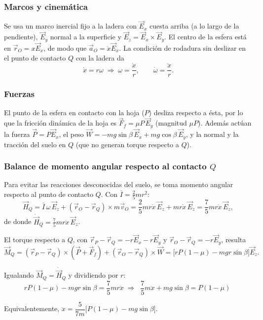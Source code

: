\begin{sol}

\subsubsection*{Marcos y cinemática}

Se usa un marco inercial fijo a la ladera con $\vec{E}_x$ cuesta arriba (a lo largo de la
pendiente), $\vec{E}_y$ normal a la superficie y $\vec{E}_z=\vec{E}_x\times\vec{E}_y$. El
centro de la esfera está en $\vec{r}_O=x\vec{E}_x$, de modo que $\vec{a}_O=\ddot{x}\vec{E}_x$.
La condición de rodadura sin deslizar en el punto de contacto $Q$ con la ladera da
$$\dot{x}=r\omega \;\Longrightarrow\; \omega=\frac{\dot{x}}{r},\qquad \dot\omega=\frac{\ddot{x}}{r}.$$

\subsubsection*{Fuerzas}

El punto de la esfera en contacto con la hoja ($P$) desliza respecto a ésta, por lo que la
fricción dinámica de la hoja es $\vec{F}_f=\mu P\,\vec{E}_y$ (magnitud $\mu P$). Además actúan
la fuerza $\vec{P}=P\vec{E}_x$, el peso $\vec{W}=-mg\sin\beta\,\vec{E}_x + mg\cos\beta\,\vec{E}_y$,
y la normal y la tracción del suelo en $Q$ (que no generan torque respecto a $Q$).

\subsubsection*{Balance de momento angular respecto al contacto $Q$}

Para evitar las reacciones desconocidas del suelo, se toma momento angular respecto al punto
de contacto $Q$. Con $\bar{I}=\tfrac25 mr^2$:
$$\vec{H}_Q = \bar{I}\,\omega\,\vec{E}_z + (\vec{r}_O-\vec{r}_Q)\times m\vec{v}_O
= \frac{2}{5}mr\dot{x}\,\vec{E}_z + mr\dot{x}\,\vec{E}_z = \frac{7}{5}mr\dot{x}\,\vec{E}_z,$$
de donde $\dot{\vec{H}}_Q = \tfrac75 mr\ddot{x}\,\vec{E}_z$.

El torque respecto a $Q$, con $\vec{r}_P-\vec{r}_Q=-r\vec{E}_x-r\vec{E}_y$ y
$\vec{r}_O-\vec{r}_Q=-r\vec{E}_y$, resulta
$$\vec{M}_Q = (\vec{r}_P-\vec{r}_Q)\times(\vec{P}+\vec{F}_f) + (\vec{r}_O-\vec{r}_Q)\times\vec{W}
= \big[rP(1-\mu) - mgr\sin\beta\big]\vec{E}_z.$$

Igualando $\vec{M}_Q=\dot{\vec{H}}_Q$ y dividiendo por $r$:
$$rP(1-\mu) - mgr\sin\beta = \frac{7}{5}mr\ddot{x}
\;\Longrightarrow\;
\boxed{\;\frac{7}{5}m\ddot{x} + mg\sin\beta = P(1-\mu)\;}$$

Equivalentemente, $\ddot{x} = \dfrac{5}{7m}\big[P(1-\mu) - mg\sin\beta\big]$.

\end{sol}
